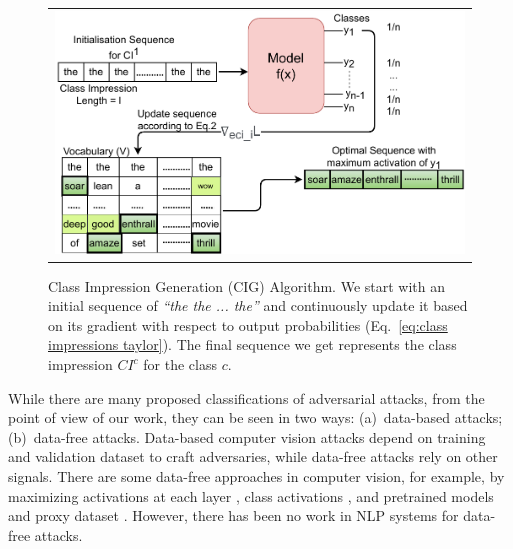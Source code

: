 \begin{figure}[htbp]
 \centering
 \begin{tabular}{c}
\includegraphics[width=\textwidth]{images/Class-Impressions.pdf}
 \end{tabular}

 \caption{
 Class Impression Generation (CIG) Algorithm. We start with an initial sequence of \textit{``the the ... the''} and continuously update it based on its gradient with respect to output probabilities (Eq.~\ref{eq:class impressions taylor}). The final sequence we get represents the class impression $CI^c$ for the class $c$.%
 }

 \label{fig:Class Impression Generation Algorithm}
\end{figure}






While there are many proposed classifications of adversarial attacks, from the point of view of our work, they can be seen in two ways: (a)~data-based attacks; (b)~data-free attacks. Data-based computer vision attacks depend on training and validation dataset to craft adversaries, while data-free attacks rely on other signals. There are some data-free approaches in computer vision, for example, by maximizing activations at each layer \cite{mopuri2017fast,mopuri2018generalizable}, class activations \cite{mopuri2018ask}, and pretrained models and proxy dataset \cite{huan2020data}. However, there has been no work in NLP systems for data-free attacks.


